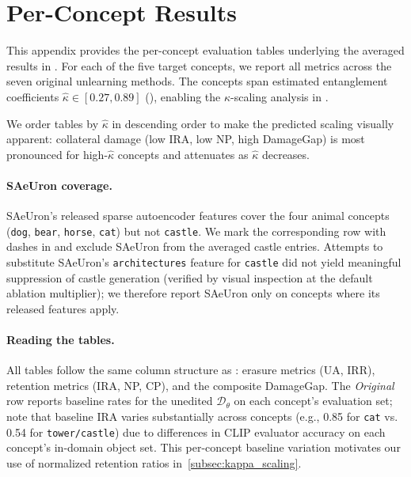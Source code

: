 \section{Per-Concept Results}
\label{app:per_concept_tables}

This appendix provides the per-concept evaluation tables underlying the averaged results in . For each of the five target concepts, we report all metrics across the seven original unlearning methods.
The concepts span estimated entanglement coefficients $\hat\kappa \in [0.27, 0.89]$ (), enabling the $\kappa$-scaling analysis in .

We order tables by $\hat\kappa$ in descending order to make the predicted scaling visually apparent: collateral damage (low IRA, low NP, high DamageGap) is most pronounced for high-$\hat\kappa$ concepts and attenuates as $\hat\kappa$ decreases.

\paragraph{SAeUron coverage.} 
SAeUron's released sparse autoencoder features cover the four animal concepts (\texttt{dog}, \texttt{bear}, \texttt{horse}, \texttt{cat}) but not \texttt{castle}. We mark the corresponding row with dashes in  and exclude SAeUron from the averaged castle entries. Attempts to substitute SAeUron's \texttt{architectures} feature for \texttt{castle} did not yield meaningful suppression of castle generation (verified by visual inspection at the default ablation multiplier); we therefore report SAeUron only on concepts where its released features apply.

\paragraph{Reading the tables.}
All tables follow the same column structure as : erasure metrics (UA, IRR), retention metrics (IRA, NP, CP), and the composite DamageGap. The \emph{Original} row reports baseline rates for the unedited $\mathcal{D}_\theta$ on each concept's evaluation set; note that baseline IRA varies substantially across concepts (e.g., {0.85} for \texttt{cat} vs. {0.54} for \texttt{tower/castle}) due to differences in CLIP evaluator accuracy on each concept's in-domain object set. This per-concept baseline variation motivates our use of normalized retention ratios in~\cref{subsec:kappa_scaling}.

